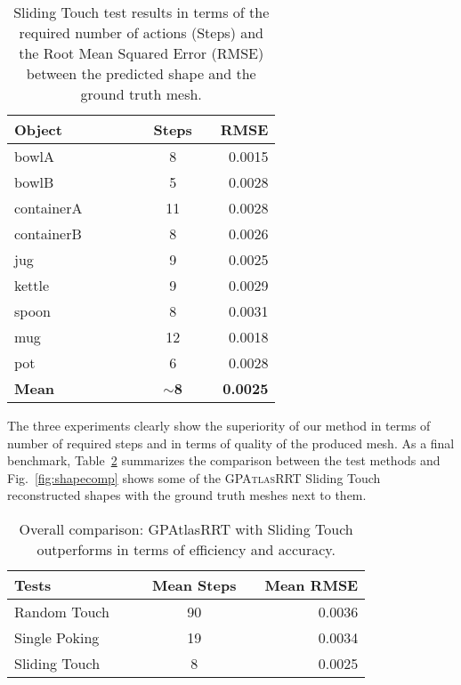 \begin{table}
    \centering
    \begin{tabularx}{0.95\columnwidth}{lccccccr}
        \toprule
        Object & & &&& Steps && RMSE \\
        \midrule
        bowlA &&& & &8 && 0.0015\\
        bowlB & &&& &5 && 0.0028\\
        containerA &&&&& 11 && 0.0028\\
        containerB &&&&& 8 && 0.0026\\
        jug &&&&& 9 && 0.0025\\
        kettle &&&&& 9 && 0.0029\\
        spoon &&&&& 8 && 0.0031\\
        mug &&&&& 12 && 0.0018\\
        pot &&&&& 6 && 0.0028\\
        \midrule
        \textbf{Mean} &&&&& $\sim$\textbf{8} && \textbf{0.0025}\\
        \bottomrule
    \end{tabularx}
    \caption{Sliding Touch test results in terms of the required
    number of actions (Steps) and the Root Mean Squared Error (RMSE) between
    the predicted shape and the ground truth mesh.}
    \label{tab:test3}
\end{table}

The three experiments clearly show the superiority of our method in terms of number of required steps
and in terms of quality of the produced mesh. As a final benchmark, Table~\ref{tab:comp} summarizes the comparison
between the test methods and Fig.~\ref{fig:shapecomp} shows some  of the \textsc{GPAtlasRRT} Sliding Touch reconstructed shapes with
the ground truth meshes next to them.
\begin{table}
    \centering
    \begin{tabularx}{0.95\columnwidth}{lccccr}
        \toprule
        Tests  &&& Mean Steps && Mean RMSE \\
        \midrule
        Random Touch & & &90 && 0.0036\\
        Single Poking && &19 && 0.0034\\
        Sliding Touch &&& 8 && 0.0025\\
        \bottomrule
    \end{tabularx}
    \caption{Overall comparison: GPAtlasRRT with Sliding Touch outperforms in terms
    of efficiency and accuracy.}
    \label{tab:comp}
\end{table}


